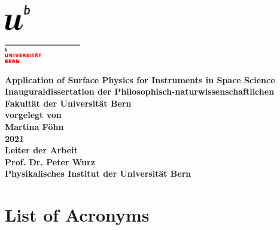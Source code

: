 \documentclass[a4paper, 12pt, abstracton]{scrartcl}
\begin{document}
\renewcommand{\arraystretch}{1.5} %
\selectfont			%
\begin{titlepage}
	
	\begin{flushright}
		\includegraphics[width=0.25\textwidth]{Bilder/logo-uni.jpg}\\[2cm]    
	\end{flushright}
	
	\begin{center} %
		\huge \bfseries Application of Surface Physics for Instruments in Space Science\\[2cm]
		\Large Inauguraldissertation der Philosophisch-naturwissenschaftlichen Fakultät der Universität Bern\\[2cm]
		\Large vorgelegt von\\[0.1cm]
		\Large Martina Föhn\\[1cm]
		\Large 2021\\[1.5cm]
		\Large Leiter der Arbeit\\[0.1cm]
		\Large Prof. Dr. Peter Wurz\\[1cm]
		\Large Physikalisches Institut der Universität Bern\\
		
	\end{center}
\end{titlepage}

	
	\newpage
	\thispagestyle{empty}
	\null
	\newpage
	\begin{abstract}

	\end{abstract}
	\newpage
	\thispagestyle{empty}
	\null
	\newpage

	\tableofcontents

	\newpage
	\thispagestyle{empty}
	\null
	\newpage
	
	\section*{List of Acronyms}
	
\end{document}
